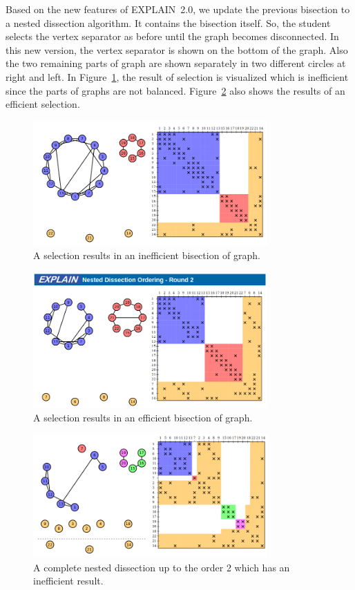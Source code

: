 \documentclass[12pt, twoside,a4paper,toc=bibliography]{scrbook}
\begin{document}
Based on the new features of \mbox{EXPLAIN 2.0}, we update the previous
bisection to a nested dissection algorithm.
It contains the bisection itself. So, the student selects the vertex separator
as before until the graph becomes disconnected.
In this new version, the vertex separator is shown on the bottom
of the graph. Also the two remaining parts of graph are shown separately
in two different circles at right and left.
In Figure~\ref{bad_bisection}, the result of selection is visualized which
is inefficient since the parts of graphs are not balanced.
Figure~\ref{good_bisection} also shows the results of an efficient selection.

\begin{figure}
\centering
\includegraphics[width=0.8\textwidth]{bad_bisection}
\caption{A selection results in an inefficient bisection of graph.}
\label{bad_bisection}
\end{figure}

\begin{figure}
\centering
\includegraphics[width=0.8\textwidth]{good_bisection}
\caption{A selection results in an efficient bisection of graph.}
\label{good_bisection}
\end{figure}

\begin{figure}
\centering
\includegraphics[width=0.8\textwidth]{bad_disection}
\caption{A complete nested dissection up to the order 2 which has an
inefficient result.}
\label{bad_disection}
\end{figure}
\end{document}
